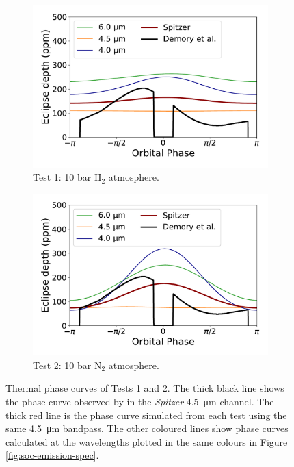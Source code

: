 \begin{figure}
  \centering
  \begin{subfigure}[t]{0.49\textwidth}
    \includegraphics[width=\textwidth]{figures/soc-lava-planets/h2-spec-pc.pdf}
    \caption{Test 1: 10 bar H$_{2}$ atmosphere.}\label{fig:soc-spec-pc-h2}
  \end{subfigure}
  \begin{subfigure}[t]{0.49\textwidth}
    \includegraphics[width=\textwidth]{figures/soc-lava-planets/n2-spec-pc.pdf}
    \caption{Test 2: 10 bar N$_{2}$ atmosphere.}\label{fig:soc-spec-pc-n2}
  \end{subfigure}
  \caption{Thermal phase curves of Tests 1 and 2. The thick black line shows the phase curve observed by \citet{demory201655cnce} in the \textit{Spitzer} \SI{4.5}{\micro\metre} channel. The thick red line is the phase curve simulated from each test using the same \SI{4.5}{\micro\metre} bandpass. The other coloured lines show phase curves calculated at the wavelengths plotted in the same colours in Figure \ref{fig:soc-emission-spec}.}
  \label{fig:soc-spec-pc}
\end{figure}

